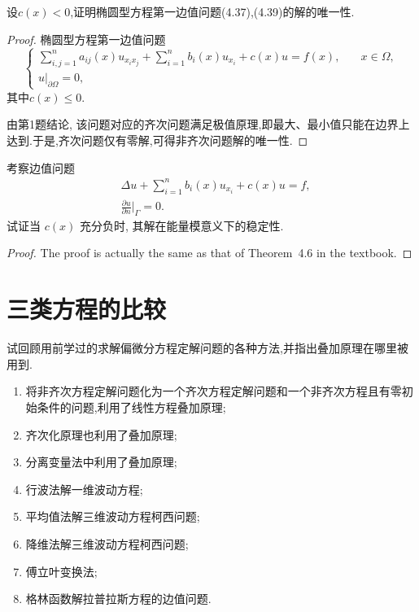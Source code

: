 \begin{exercise}
	设$c(x)<0$,证明椭圆型方程第一边值问题(4.37),(4.39)的解的唯一性.
\end{exercise}

\begin{proof}
	椭圆型方程第一边值问题
	$$\begin{cases}
		\sum\limits_{i,j=1}^na_{ij}(x)u_{x_ix_j}+\sum\limits_{i=1}^nb_i(x)u_{x_i}+c(x)u=f(x),&\quad x\in\Omega,\\
		u|_{\partial\Omega}=0,
	\end{cases}$$
	其中$c(x)\leq0$.
	
	由第1题结论, 该问题对应的齐次问题满足极值原理,即最大、最小值只能在边界上达到.于是,齐次问题仅有零解,可得非齐次问题解的唯一性.
\end{proof}


\begin{exercise}
  考察边值问题
  \begin{align*}
    & \Delta u + \sum_{i=1}^{n} b_i(x) u_{x_i} + c(x)u = f, \\
    & \frac{\partial u}{\partial n}\bigg|_{\varGamma} = 0.
  \end{align*}
  试证当 $c(x)$ 充分负时, 其解在能量模意义下的稳定性.
\end{exercise}

\begin{proof}
  The proof is actually the same as that of Theorem~4.6 in the textbook.
\end{proof}


\section{三类方程的比较}


\begin{exercise}
	试回顾用前学过的求解偏微分方程定解问题的各种方法,并指出叠加原理在哪里被用到.
\end{exercise}

\begin{solve}
	\begin{enumerate}[(1)]
		\item 将非齐次方程定解问题化为一个齐次方程定解问题和一个非齐次方程且有零初始条件的问题,利用了线性方程叠加原理;
		\item 齐次化原理也利用了叠加原理;
		\item 分离变量法中利用了叠加原理;
		\item 行波法解一维波动方程;
		\item 平均值法解三维波动方程柯西问题;
		\item 降维法解三维波动方程柯西问题;
		\item 傅立叶变换法;
		\item 格林函数解拉普拉斯方程的边值问题.
	\end{enumerate}
\end{solve}


